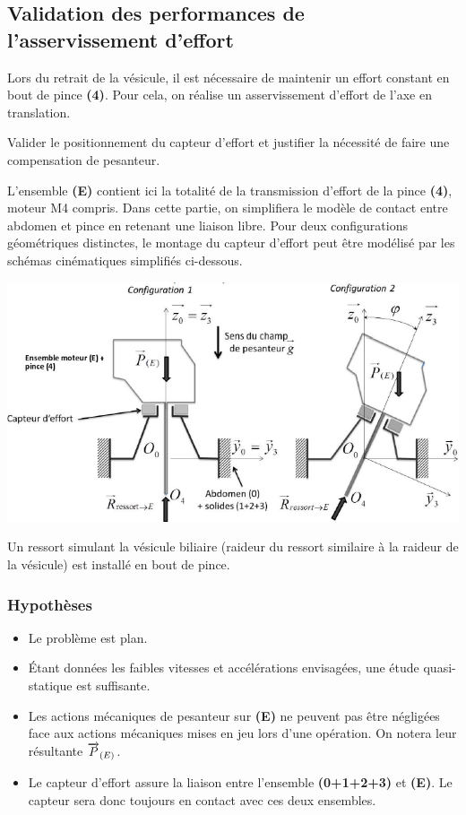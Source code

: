 \documentclass[10pt,fleqn]{article} %
\begin{document}
\begin{multicols}{2}
\section*{Validation des performances de l'asservissement d'effort}
Lors du retrait de la vésicule, il est nécessaire de maintenir un effort constant en bout de pince \textbf{(4)}. Pour cela, on réalise un asservissement d'effort de l'axe en translation. 
\begin{obj}
Valider le positionnement du capteur d'effort et justifier la nécessité de faire une compensation de pesanteur. 
\end{obj}

L'ensemble \textbf{(E)} contient ici la totalité de la transmission d’effort de la pince \textbf{(4)}, moteur M4 compris.
Dans cette partie, on simplifiera le modèle de contact entre abdomen et pince en retenant une liaison libre.
Pour deux configurations géométriques distinctes, le montage du capteur d’effort peut être modélisé par les
schémas cinématiques simplifiés ci-dessous.

\begin{center}
\includegraphics[width=\linewidth]{images/fig_07}
\end{center}

Un ressort simulant la vésicule biliaire (raideur du ressort similaire à la
raideur de la vésicule) est installé en bout de pince.
\subsubsection*{Hypothèses}
\begin{itemize}
\item Le problème est plan.
\item Étant données les faibles vitesses et accélérations envisagées, une étude quasi-statique est
suffisante.
\item Les actions mécaniques de pesanteur sur \textbf{(E)} ne peuvent pas être négligées face aux actions mécaniques mises en jeu lors d’une opération. On notera leur résultante $\overrightarrow{P}_{(E)}$.
\item Le capteur d’effort assure la liaison entre l’ensemble \textbf{(0+1+2+3)} et \textbf{(E)}. Le capteur sera donc toujours en contact avec ces deux ensembles.
\end{itemize}

\end{multicols}
\end{document}
